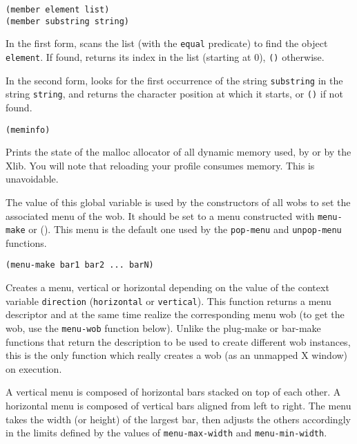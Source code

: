 
{\usagefont\begin{verbatim}
(member element list)
(member substring string)
\end{verbatim}}\usageupspace

In the first form, scans the list (with the \verb"equal" predicate) to find
the object \verb"element". If found, returns its index in the list (starting
at 0), \verb"()" otherwise.

In the second form, looks for the first occurrence of the string
\verb"substring" in the string \verb"string", and returns the character
position at which it starts, or \verb"()" if not found.

        
{\usagefont\begin{verbatim}
(meminfo)
\end{verbatim}}\usageupspace

Prints the state of the malloc allocator of all dynamic memory used, by
{\WOOL} or by the Xlib. You will note that reloading your profile consumes
memory.  This is unavoidable.

        

The value of this global variable is used by the constructors of all wobs to
set the associated menu of the wob.  It should be set to a menu constructed
with \verb"menu-make" or ().  This menu is the default one used by the
\verb"pop-menu" and \verb"unpop-menu" functions.

        
{\usagefont\begin{verbatim}
(menu-make bar1 bar2 ... barN)
\end{verbatim}}\usageupspace

Creates a menu, vertical or horizontal depending on the value of the context
variable \verb"direction" ({\tt horizontal} or {\tt vertical}). This
function returns a menu descriptor and at the same time realize the
corresponding menu wob (to get the
wob, use the \verb"menu-wob" function below). Unlike the plug-make or
bar-make functions that return the {\WOOL} description to be used to create
different wob instances, this is the only {\WOOL} function which really
creates a wob (as an unmapped X window) on execution.

A vertical menu is composed of horizontal bars stacked on top of each other.
A horizontal menu is composed of vertical bars aligned from left to right.
The menu takes the width (or height) of the largest bar, then adjusts the
others accordingly in the limits defined by the values of 
\verb"menu-max-width" and \verb"menu-min-width".
\label{menu-max-width}\label{menu-min-width}


